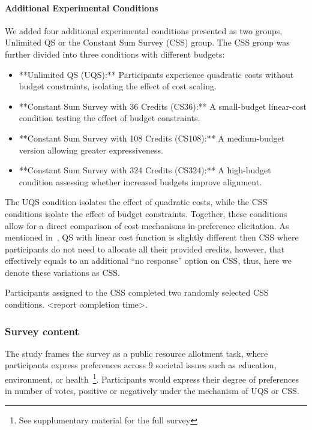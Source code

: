 \paragraph{Additional Experimental Conditions}
We added four additional experimental conditions presented as two groups, Unlimited QS or the Constant Sum Survey (CSS) group. The CSS group was further divided into three conditions with different budgets:

\begin{itemize}
    \item **Unlimited QS (UQS):** Participants experience quadratic costs without budget constraints, isolating the effect of cost scaling.
    \item **Constant Sum Survey with 36 Credits (CS36):** A small-budget linear-cost condition testing the effect of budget constraints.
    \item **Constant Sum Survey with 108 Credits (CS108):** A medium-budget version allowing greater expressiveness.
    \item **Constant Sum Survey with 324 Credits (CS324):** A high-budget condition assessing whether increased budgets improve alignment.
\end{itemize}

The UQS condition isolates the effect of quadratic costs, while the CSS conditions isolate the effect of budget constraints. Together, these conditions allow for a direct comparison of cost mechanisms in preference elicitation. As mentioned in~, QS with linear cost function is slightly different then CSS where participants do not need to allocate all their provided credits, however, that effectively equals to an additional ``no response'' option on CSS, thus, here we denote these variations as CSS.

Participants assigned to the CSS completed two randomly selected CSS conditions. <report completion time>.

\subsubsection{Survey content}
The study frames the survey as a public resource allotment task, where participants express preferences across 9 societal issues such as education, environment, or health~\footnote{See supplumentary material for the full survey}. Participants would express their degree of preferences in number of votes, positive or negatively under the mechanism of UQS or CSS.

